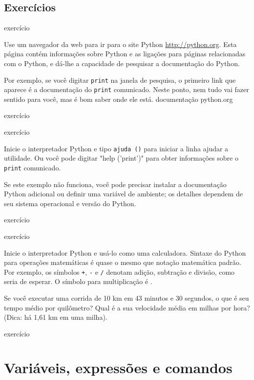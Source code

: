 \documentclass[10pt]{book}
\begin{document}
\section{Exercícios}

\begin{} exercício

Use um navegador da web para ir para o site Python \url{http://python.org}.
Esta página contém informações sobre Python e as ligações
para páginas relacionadas com o Python, e dá-lhe a capacidade de pesquisar
a documentação do Python.

Por exemplo, se você digitar {\tt print} na janela de pesquisa, o
primeiro link que aparece é a documentação do {\tt print}
comunicado. Neste ponto, nem tudo vai fazer sentido para você,
mas é bom saber onde ele está.
\index{} documentação
\index{} python.org

\end{} exercício

\begin{} exercício

Inicie o interpretador Python e tipo {\tt ajuda ()} para iniciar a linha
ajudar a utilidade. Ou você pode digitar \verbo "help ('print')" para obter informações
sobre o {\tt print} comunicado.

Se este exemplo não funciona, você
pode precisar instalar a documentação Python adicional ou definir uma
variável de ambiente; os detalhes dependem de seu sistema operacional e
versão do Python.

\end{} exercício

\begin{} exercício

Inicie o interpretador Python e usá-lo como uma calculadora.
Sintaxe do Python para operações matemáticas é quase o mesmo que
notação matemática padrão. Por exemplo, os símbolos
{\tt +}, {\tt -} e {\tt /} denotam adição, subtração
e divisão, como seria de esperar. O símbolo para
multiplicação é {\tt *}.

Se você executar uma corrida de 10 km em 43 minutos e 30 segundos, o que é seu
tempo médio por quilômetro? Qual é a sua velocidade média em milhas por hora?
(Dica: há 1,61 km em uma milha).

\end{} exercício




\chapter{Variáveis, expressões e comandos}
\end{document}
